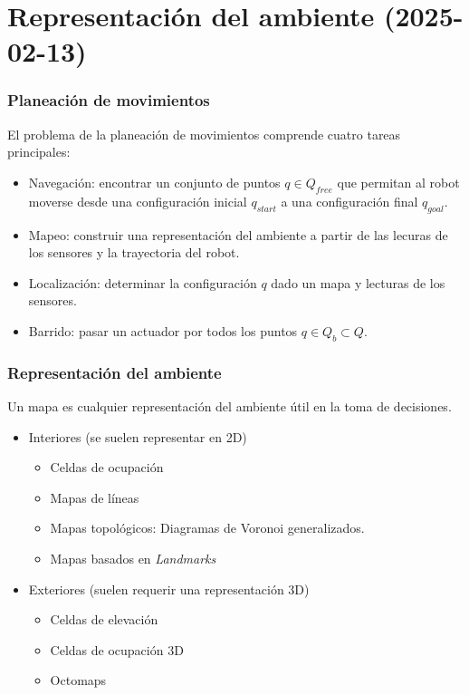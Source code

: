 \section{Representación del ambiente (2025-02-13)}

\begin{frame}\frametitle{Planeación de movimientos}
  El problema de la planeación de movimientos comprende cuatro tareas principales:
  \begin{itemize}
  \item Navegación: encontrar un conjunto de puntos $q \in Q_{free}$ que permitan al robot moverse desde una configuración inicial $q_{start}$ a una configuración final $q_{goal}$. 
  \item Mapeo: construir una representación del ambiente a partir de las lecuras de los sensores y la trayectoria del robot. 
  \item Localización: determinar la configuración $q$ dado un mapa y lecturas de los sensores. 
  \item Barrido: pasar un actuador por todos los puntos $q\in Q_b \subset Q$.
  \end{itemize}
\end{frame}

\begin{frame}\frametitle{Representación del ambiente}
  Un mapa es cualquier representación del ambiente útil en la toma de decisiones.
  \begin{itemize}
  \item Interiores (se suelen representar en 2D)
    \begin{itemize}
    \item Celdas de ocupación
    \item Mapas de líneas
    \item Mapas topológicos: Diagramas de Voronoi generalizados. 
    \item Mapas basados en \textit{Landmarks}
    \end{itemize}
  \item Exteriores (suelen requerir una representación 3D)
    \begin{itemize}
    \item Celdas de elevación
    \item Celdas de ocupación 3D
    \item Octomaps
    \end{itemize}
  \end{itemize}
\end{frame}


